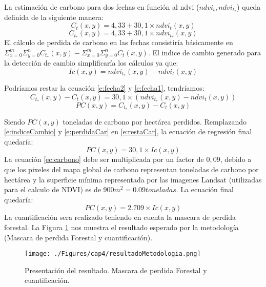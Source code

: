 La estimaci\'on de carbono para dos fechas en funci\'on al ndvi ($ ndvi_{t},ndvi_{t_{*}} $) queda definida de la siguiente manera:
		\begin{equation}
		\label{e:fecha1}
		C_{t}(x,y)=4,33+30,1 \times ndvi_{t}(x,y)
		\end{equation}
		\begin{equation}
		\label{e:fecha2}
		C_{t_{*}}(x,y)=4,33+30,1 \times ndvi_{t_{*}}(x,y)
		\end{equation}
El c\'alculo de perdida de carbono en las fechas consistir\'ia b\'asicamente en $\Sigma^{m}_{x=0}\Sigma^{n}_{y=0} C_{t_{*}}(x,y) - \Sigma^{m}_{x=0}\Sigma^{n}_{y=0} C_{t}(x,y) $. El indice de cambio generado para la detecci\'on de cambio simplificar\'ia los c\'alculos ya que:
		\begin{equation}
		\label{e:indiceCambio}
		Ic(x,y)=ndvi_{t_{*}}(x,y) -ndvi_{t}(x,y)
		\end{equation}		

Podr\'iamos restar la ecuaci\'on \ref{e:fecha2} y \ref{e:fecha1}, tendr\'iamos:
		\begin{equation}
		\label{e:restaCar}
		C_{t_{*}}(x,y) - C_{t}(x,y)= 30,1 \times (ndvi_{t_{*}}(x,y)-ndvi_{t}(x,y))
		\end{equation}		
		\begin{equation}
		\label{e:perdidaCar}
		PC(x,y)= C_{t_{*}}(x,y) - C_{t}(x,y)
		\end{equation}		
		
Siendo $ PC(x,y)$ toneladas de carbono por hect\'area perdidos. Remplazando \ref{e:indiceCambio} y \ref{e:perdidaCar} en \ref{e:restaCar}, la ecuaci\'on de regresi\'on final quedar\'ia:
\begin{equation}\label{ec:carbono}
PC(x,y) = 30,1 \times Ic(x,y)
\end{equation}
La ecuaci\'on \ref{ec:carbono} debe ser multiplicada por un factor de $ 0,09 $, debido a que los pixeles del mapa global de carbono representan toneladas de carbono por hect\'area \cite{saatchi2011benchmark} y la superficie m\'inima representada por las imagenes Landsat (utilizadas para el calculo de NDVI) es de $ 900m^{2}=0.09 toneladas $. La ecuaci\'on final quedar\'ia:
\begin{equation}\label{ec:carbonoFinal}
PC(x,y) = 2.709 \times Ic(x,y)
\end{equation}
La cuantificaci\'on sera realizado teniendo en cuenta la mascara de perdida forestal. La Figura \ref{fig:resulPC} nos muestra el resultado esperado por la metodolog\'ia (Mascara de perdida Forestal y cuantificaci\'on).
\begin{figure}[H]
	\centering
	\texttt{[image: ./Figures/cap4/resultadoMetodologia.png]}
	\caption{Presentaci\'on del resultado. Mascara de perdida Forestal y cuantificaci\'on.}
	\label{fig:resulPC}
\end{figure}
